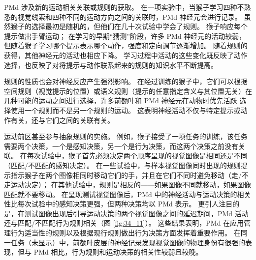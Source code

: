 PMd 涉及新的运动相关关联或规则的获取。 在一项实验中，当猴子学习四种不熟悉的视觉线索和四种不同的运动方向之间的关联时，PMd 神经元会进行记录。 虽然猴子的选择最初是随机的，但他们在几十次试验中学会了规则。 猴子响应每个提示做出手臂运动； 在学习的早期“猜测”阶段，许多 PMd 神经元的活动较弱，但随着猴子学习哪个提示表示哪个动作，强度和定向调节逐渐增加。 随着规则的获得，其他神经元的活动也相应下降。 学习过程中活动的这些变化既反映了动作选择，也反映了对将提示与动作联系起来的规则的知识水平不断提高。

规则的性质也会对神经反应产生强烈影响。 在经过训练的猴子中，它们可以根据空间规则（视觉提示的位置）或语义规则（提示的任意指定含义与其位置无关）在几种可能的运动之间进行选择，许多前额叶和 PMd 神经元在动物时优先活跃 选择使用一个规则而不是另一个规则的运动。 这表明神经活动不仅与特定提示或动作有关，还与它们之间的关联有关。

运动前区甚至参与抽象规则的实施。 例如，猴子接受了一项任务的训练，该任务需要两个决策，一个是感知决策，另一个是行为决策，而这两个决策之前没有关联。 在每次试验中，猴子首先必须决定两个顺序呈现的视觉图像是相同还是不同（匹配/不匹配的感知决定）。 在一些试验中，与样本视觉图像同时出现的规则提示指示猴子在两个图像相同时移动它们的手，并且在它们不同时避免移动（走/不走运动决定）； 在其他试验中，规则是相反的——如果图像不同就移动，如果图像匹配就不要移动。 在呈现测试视觉图像后，PMd 中的神经活动与运动决策的相关性比每次试验中的感知决策更强，但两种决策均以 PMd 表示。 
更引人注目的是，在测试图像出现后引导运动决策的两个视觉图像之间的延迟期间，PMd 活动还与匹配/不匹配行为规则相关（图 \ref{fig:34_11}）。
这些结果表明，PMd 在应用管理行为适当性的规则以及根据现行规则做出行为决策方面发挥着重要作用。 
在同一任务（未显示）中，前额叶皮层的神经记录发现视觉图像的物理身份有很强的表现，但与 PMd 相比，行为规则和运动决策的相关性较弱且较晚。

